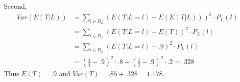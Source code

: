 \documentclass[paper=a4, fontsize=11pt]{scrartcl} %
\numberwithin{equation}{section} %
\numberwithin{figure}{section} %
\numberwithin{table}{section} %
\begin{document}
Second, 
\begin{align*}
Var(E(T | L)) &= \sum_{l \in R_L} (E(T | L = l) - E(E(T | L)))^2 \cdot P_L(l)\\
   &= \sum_{l \in R_L} (E(T | L = l) - E(T))^2 \cdot P_L(l)\\
   &= \sum_{l \in R_L} (E(T | L = l) - .9)^2 \cdot P_L(l)\\
   &= (\frac{1}{1} - .9)^2 \cdot .8 + (\frac{1}{2} -.9)^2 \cdot .2 = .328
\end{align*}
Thus $E(T) = .9$ and $Var(T) = .85 + .328 = 1.178$.

\end{document}

